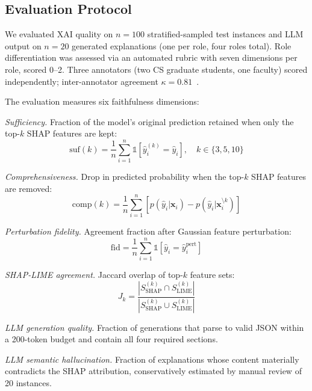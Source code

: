 \documentclass[sensors,apajournal,article,submit,moreauthors]{Definitions/mdpi}
\begin{document}
\subsection{Evaluation Protocol}

We evaluated XAI quality on $n=100$ stratified-sampled test instances and LLM output on $n=20$ generated explanations (one per role, four roles total). Role differentiation was assessed via an automated rubric with seven dimensions per role, scored 0--2. Three annotators (two CS graduate students, one faculty) scored independently; inter-annotator agreement $\kappa = 0.81$~\citep{weerts2019human}.

The evaluation measures six faithfulness dimensions:

\textit{Sufficiency.} Fraction of the model's original prediction retained when only the top-$k$ SHAP features are kept:
\begin{equation}
\mathrm{suf}(k) = \frac{1}{n}\sum_{i=1}^{n} \mathbb{1}\!\left[\hat{y}_i^{(k)} = \hat{y}_i\right], \quad k \in \{3, 5, 10\}
\end{equation}

\textit{Comprehensiveness.} Drop in predicted probability when the top-$k$ SHAP features are removed:
\begin{equation}
\mathrm{comp}(k) = \frac{1}{n}\sum_{i=1}^{n} \left[ p(\hat{y}_i | \mathbf{x}_i) - p(\hat{y}_i | \mathbf{x}_i^{\setminus k}) \right]
\end{equation}

\textit{Perturbation fidelity.} Agreement fraction after Gaussian feature perturbation:
\begin{equation}
\mathrm{fid} = \frac{1}{n}\sum_{i=1}^{n} \mathbb{1}\!\left[\hat{y}_i = \hat{y}_i^{\mathrm{pert}}\right]
\end{equation}

\textit{SHAP-LIME agreement.} Jaccard overlap of top-$k$ feature sets:
\begin{equation}
J_k = \frac{|S_{\mathrm{SHAP}}^{(k)} \cap S_{\mathrm{LIME}}^{(k)}|}{|S_{\mathrm{SHAP}}^{(k)} \cup S_{\mathrm{LIME}}^{(k)}|}
\end{equation}

\textit{LLM generation quality.} Fraction of generations that parse to valid JSON within a 200-token budget and contain all four required sections.

\textit{LLM semantic hallucination.} Fraction of explanations whose content materially contradicts the SHAP attribution, conservatively estimated by manual review of 20 instances.
\end{document}
